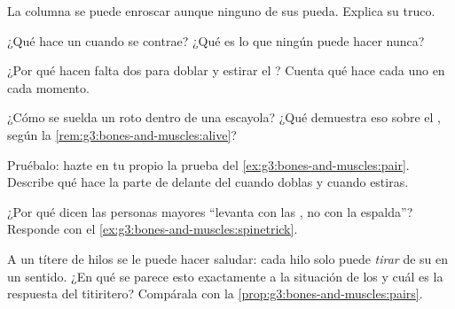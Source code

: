 \begin{exercise}[$\star$]\label{exo:g3:bones-and-muscles:4}
La columna se puede enroscar aunque ninguno de sus  pueda.
Explica su truco.
\end{exercise}

\begin{exercise}[$\star$]\label{exo:g3:bones-and-muscles:5}
¿Qué hace un  cuando se contrae? ¿Qué es lo que ningún 
puede hacer nunca?
\end{exercise}

\begin{exercise}[$\star$]\label{exo:g3:bones-and-muscles:6}
¿Por qué hacen falta dos  para doblar y estirar el ?
Cuenta qué hace cada uno en cada momento.
\end{exercise}

\begin{exercise}[$\star$]\label{exo:g3:bones-and-muscles:7}
¿Cómo se suelda un  roto dentro de una escayola? ¿Qué demuestra
eso sobre el , según la \cref{rem:g3:bones-and-muscles:alive}?
\end{exercise}

\begin{exercise}[$\star$]\label{exo:g3:bones-and-muscles:8}
Pruébalo: hazte en tu propio  la prueba del
\cref{ex:g3:bones-and-muscles:pair}. Describe qué hace la parte de
delante del  cuando doblas y cuando estiras.
\end{exercise}

\begin{exercise}[$\star\star$]\label{exo:g3:bones-and-muscles:9}
¿Por qué dicen las personas mayores ``levanta con las , no con
la espalda''? Responde con el \cref{ex:g3:bones-and-muscles:spinetrick}.
\end{exercise}

\begin{exercise}[$\star\star$]\label{exo:g3:bones-and-muscles:10}
A un títere de hilos se le puede hacer saludar: cada hilo solo puede
\emph{tirar} de su  en un sentido. ¿En qué se parece esto
exactamente a la situación de los  y cuál es la respuesta del
titiritero? Compárala con la \cref{prop:g3:bones-and-muscles:pairs}.
\end{exercise}
